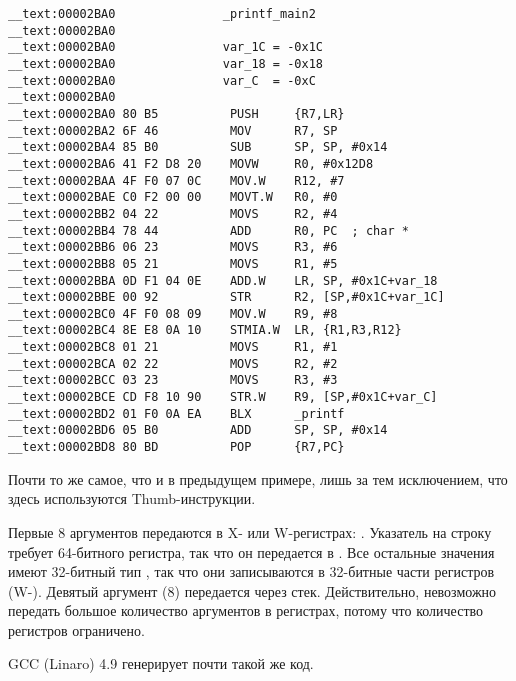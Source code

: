 \myparagraph{\OptimizingXcodeIV: \ThumbTwoMode}

\begin{lstlisting}
__text:00002BA0               _printf_main2
__text:00002BA0
__text:00002BA0               var_1C = -0x1C
__text:00002BA0               var_18 = -0x18
__text:00002BA0               var_C  = -0xC
__text:00002BA0
__text:00002BA0 80 B5          PUSH     {R7,LR}
__text:00002BA2 6F 46          MOV      R7, SP
__text:00002BA4 85 B0          SUB      SP, SP, #0x14
__text:00002BA6 41 F2 D8 20    MOVW     R0, #0x12D8
__text:00002BAA 4F F0 07 0C    MOV.W    R12, #7
__text:00002BAE C0 F2 00 00    MOVT.W   R0, #0
__text:00002BB2 04 22          MOVS     R2, #4
__text:00002BB4 78 44          ADD      R0, PC  ; char *
__text:00002BB6 06 23          MOVS     R3, #6
__text:00002BB8 05 21          MOVS     R1, #5
__text:00002BBA 0D F1 04 0E    ADD.W    LR, SP, #0x1C+var_18
__text:00002BBE 00 92          STR      R2, [SP,#0x1C+var_1C]
__text:00002BC0 4F F0 08 09    MOV.W    R9, #8
__text:00002BC4 8E E8 0A 10    STMIA.W  LR, {R1,R3,R12}
__text:00002BC8 01 21          MOVS     R1, #1
__text:00002BCA 02 22          MOVS     R2, #2
__text:00002BCC 03 23          MOVS     R3, #3
__text:00002BCE CD F8 10 90    STR.W    R9, [SP,#0x1C+var_C]
__text:00002BD2 01 F0 0A EA    BLX      _printf
__text:00002BD6 05 B0          ADD      SP, SP, #0x14
__text:00002BD8 80 BD          POP      {R7,PC}
\end{lstlisting}

Почти то же самое, что и в предыдущем примере,
лишь за тем исключением, что здесь используются Thumb-инструкции.






Первые 8 аргументов передаются в X- или W-регистрах: \ARMPCS.
Указатель на строку требует 64-битного регистра, так что он передается в .
Все остальные значения имеют 32-битный тип \Tint, так что они записываются в 32-битные части регистров (W-).
Девятый аргумент (8) передается через стек.
Действительно, невозможно передать большое количество аргументов в регистрах, потому что количество регистров ограничено.

\Optimizing GCC (Linaro) 4.9 генерирует почти такой же код.
